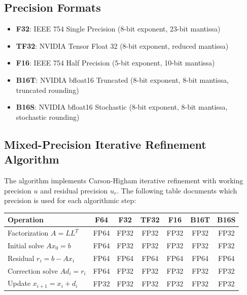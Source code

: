 \documentclass[11pt,a4paper]{article}
\begin{document}
\subsection{Precision Formats}
\begin{itemize}
  \item \textbf{F32}: IEEE 754 Single Precision (8-bit exponent, 23-bit mantissa)
  \item \textbf{TF32}: NVIDIA Tensor Float 32 (8-bit exponent, reduced mantissa)
  \item \textbf{F16}: IEEE 754 Half Precision (5-bit exponent, 10-bit mantissa)
  \item \textbf{B16T}: NVIDIA bfloat16 Truncated (8-bit exponent, 8-bit mantissa, truncated rounding)
  \item \textbf{B16S}: NVIDIA bfloat16 Stochastic (8-bit exponent, 8-bit mantissa, stochastic rounding)
\end{itemize}

\subsection{Mixed-Precision Iterative Refinement Algorithm}

The algorithm implements Carson-Higham iterative refinement with working precision $u$ and residual precision $u_r$. The following table documents which precision is used for each algorithmic step:

\begin{center}
\begin{tabular}{l|cccccc}
\toprule
\textbf{Operation} & \textbf{F64} & \textbf{F32} & \textbf{TF32} & \textbf{F16} & \textbf{B16T} & \textbf{B16S} \\
\midrule
Factorization $A = LL^T$ & FP64 & FP32 & FP32 & FP32 & FP32 & FP32 \\
Initial solve $Ax_0 = b$ & FP64 & FP32 & FP32 & FP32 & FP32 & FP32 \\
Residual $r_i = b - Ax_i$ & FP64 & FP64 & FP64 & FP64 & FP64 & FP64 \\
Correction solve $Ad_i = r_i$ & FP64 & FP32 & FP32 & FP32 & FP32 & FP32 \\
Update $x_{i+1} = x_i + d_i$ & FP32 & FP32 & FP32 & FP32 & FP32 & FP32 \\
\bottomrule
\end{tabular}
\end{center}
\end{document}
